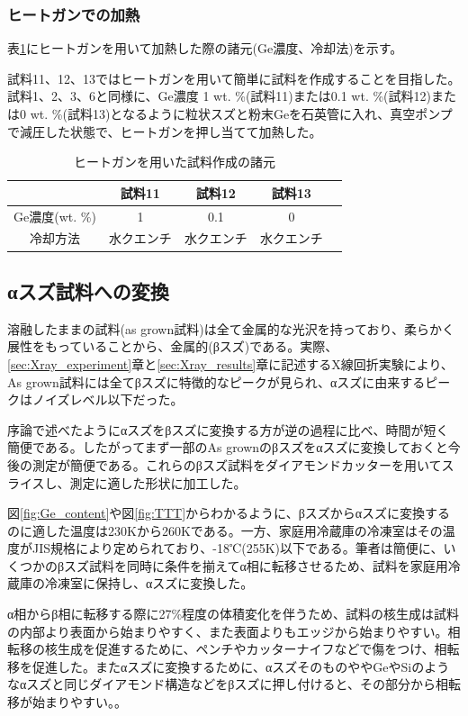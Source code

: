 \subsubsection{ヒートガンでの加熱}
表\ref{tab:sample_prep_heatgun}にヒートガンを用いて加熱した際の諸元(Ge濃度、冷却法)を示す。

試料11、12、13ではヒートガンを用いて簡単に試料を作成することを目指した。試料1、2、3、6と同様に、Ge濃度 1 wt. \%(試料11)または0.1 wt. \%(試料12)または0 wt. \%(試料13)となるように粒状スズと粉末Geを石英管に入れ、真空ポンプで減圧した状態で、ヒートガンを押し当てて加熱した。
\begin{table}[htb]
    \begin{center}
  \begin{tabular}{c|cccc}
    & 試料11 & 試料12 & 試料13 \\ \hline
    Ge濃度(wt. \%)  & 1 & 0.1 &  0  \\
    冷却方法 & 水クエンチ & 水クエンチ& 水クエンチ \\
  \end{tabular}
  \caption{ヒートガンを用いた試料作成の諸元}
  \label{tab:sample_prep_heatgun}
    \end{center}
\end{table}


\subsection{αスズ試料への変換}
溶融したままの試料(as grown試料)は全て金属的な光沢を持っており、柔らかく展性をもっていることから、金属的(βスズ)である。実際、\ref{sec:Xray_experiment}章と\ref{sec:Xray_results}章に記述するX線回折実験により、As grown試料には全てβスズに特徴的なピークが見られ、αスズに由来するピークはノイズレベル以下だった。

序論で述べたようにαスズをβスズに変換する方が逆の過程に比べ、時間が短く簡便である。したがってまず一部のAs grownのβスズをαスズに変換しておくと今後の測定が簡便である。これらのβスズ試料をダイアモンドカッターを用いてスライスし、測定に適した形状に加工した。

図\ref{fig:Ge_content}や図\ref{fig:TTT}からわかるように、βスズからαスズに変換するのに適した温度は230Kから260Kである\cite{Matvienko,Ogino,Cornelius}。一方、家庭用冷蔵庫の冷凍室はその温度がJIS規格により定められており、-18℃(255K)以下である。筆者は簡便に、いくつかのβスズ試料を同時に条件を揃えてα相に転移させるため、試料を家庭用冷蔵庫の冷凍室に保持し、αスズに変換した。

α相からβ相に転移する際に27\%程度の体積変化を伴うため、試料の核生成は試料の内部より表面から始まりやすく、また表面よりもエッジから始まりやすい\cite{Cornelius}。相転移の核生成を促進するために、ペンチやカッターナイフなどで傷をつけ、相転移を促進した。またαスズに変換するために、αスズそのものややGeやSiのようなαスズと同じダイアモンド構造などをβスズに押し付けると、その部分から相転移が始まりやすい。\cite{Cornelius}。

